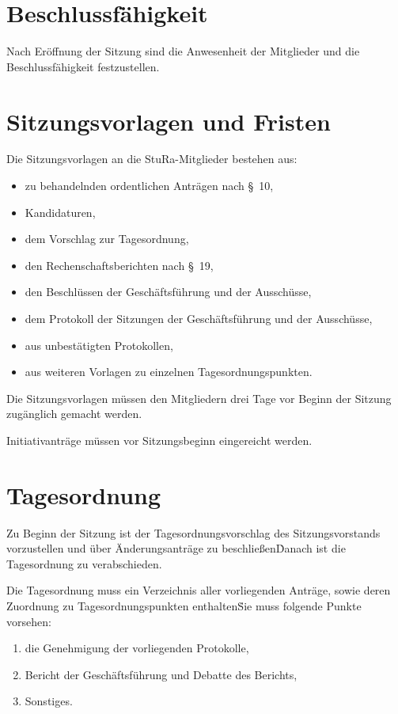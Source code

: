 \begin{multicols}{2}
\section{Beschlussfähigkeit}

\Abs \Satz Nach Eröffnung der Sitzung sind die Anwesenheit der Mitglieder und die Beschlussfähigkeit festzustellen.



\section{Sitzungsvorlagen und Fristen}

\Abs \Satz Die Sitzungsvorlagen an die StuRa-Mitglieder bestehen aus:
\begin{itemize}
\item zu behandelnden ordentlichen Anträgen nach §~10,
\item Kandidaturen,
\item dem Vorschlag zur Tagesordnung,
\item den Rechenschaftsberichten nach §~19,
\item den Beschlüssen der Geschäftsführung und der Ausschüsse,
\item dem Protokoll der Sitzungen der Geschäftsführung und der Ausschüsse,
\item aus unbestätigten Protokollen,
\item aus weiteren Vorlagen zu einzelnen Tagesordnungspunkten.
\end{itemize}

\Abs \Satz Die Sitzungsvorlagen müssen den Mitgliedern drei Tage vor Beginn der Sitzung zugänglich gemacht werden.

\Abs \Satz Initiativanträge müssen vor Sitzungsbeginn eingereicht werden.



\section{Tagesordnung}

\Abs \Satz Zu Beginn der Sitzung ist der Tagesordnungsvorschlag des Sitzungsvorstands vorzustellen und über Änderungsanträge zu beschließen\. Danach ist die Tagesordnung zu verabschieden.

\Abs \Satz Die Tagesordnung muss ein Verzeichnis aller vorliegenden Anträge, sowie deren Zuordnung zu Tagesordnungspunkten enthalten\. Sie muss folgende Punkte vorsehen:
\begin{enumerate}
\item die Genehmigung der vorliegenden Protokolle,
\item Bericht der Geschäftsführung und Debatte des Berichts,
\item Sonstiges.
\end{enumerate}


\end{multicols}
